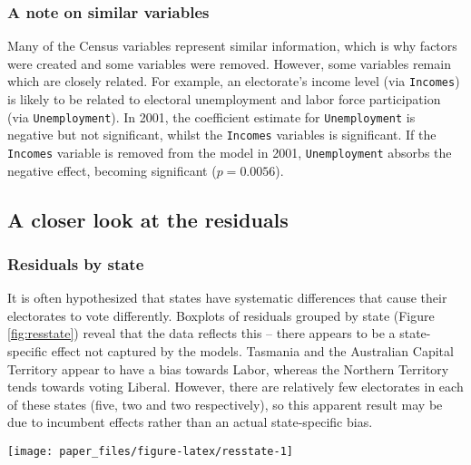 \documentclass[times, doublespace]{anzsauth}
\let\origfigure\figure
\let\endorigfigure\endfigure
\renewenvironment{figure}[1][2] {
    \expandafter\origfigure\expandafter[htbp]
} {
    \endorigfigure
}
\begin{document}
\hypertarget{a-note-on-similar-variables}{%
\subsubsection*{A note on similar variables}\label{a-note-on-similar-variables}}

Many of the Census variables represent similar information, which is why factors were created and some variables were removed. However, some variables remain which are closely related. For example, an electorate's income level (via \texttt{Incomes}) is likely to be related to electoral unemployment and labor force participation (via \texttt{Unemployment}). In 2001, the coefficient estimate for \texttt{Unemployment} is negative but not significant, whilst the \texttt{Incomes} variables is significant. If the \texttt{Incomes} variable is removed from the model in 2001, \texttt{Unemployment} absorbs the negative effect, becoming significant (\(p = 0.0056\)).

\hypertarget{a-closer-look-at-the-residuals}{%
\subsection{A closer look at the residuals}\label{a-closer-look-at-the-residuals}}

\hypertarget{residuals-by-state}{%
\subsubsection*{Residuals by state}\label{residuals-by-state}}

It is often hypothesized that states have systematic differences that cause their electorates to vote differently. Boxplots of residuals grouped by state (Figure \ref{fig:resstate}) reveal that the data reflects this -- there appears to be a state-specific effect not captured by the models. Tasmania and the Australian Capital Territory appear to have a bias towards Labor, whereas the Northern Territory tends towards voting Liberal. However, there are relatively few electorates in each of these states (five, two and two respectively), so this apparent result may be due to incumbent effects rather than an actual state-specific bias.

\begin{figure}[h]

{\centering \texttt{[image: paper\_files/figure-latex/resstate-1]} 

}

\caption{Boxplot of residuals by state with jittered points. States ordered by median residual. A state-specific bias not captured by the model is evident.}\label{fig:resstate}
\end{figure}
\end{document}
